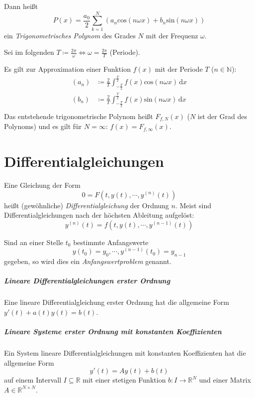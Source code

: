 			Dann heißt \[ P(x) = \frac{a _ 0}{2} \sum _ { k = 1 } ^ N (a _ n \text{cos}(n \omega x) + b _ n \text{sin}(n \omega x)) \] ein \textit{Trigonometrisches Polynom} des Grades $ N $ mit der Frequenz $ \omega $.

			Sei im folgenden $ T \coloneqq \frac{2\pi}{\omega} \iff \omega = \frac{2\pi}{T} $ (Periode).

			Es gilt zur Approximation einer Funktion $ f(x) $ mit der Periode $ T $ ($ n \in \mathbb{N} $):
			\begin{align*}
				(a _ n) & \coloneqq \frac{2}{T} \int _ { - \frac{T}{2} } ^ \frac{T}{2} \! f(x) \text{cos}(n \omega x) \, \mathrm{d}x \\
				(b _ n) & \coloneqq \frac{2}{T} \int _ { - \frac{T}{2} } ^ \frac{T}{2} \! f(x) \text{sin}(n \omega x) \, \mathrm{d}x \\
			\end{align*}
			Das entstehende trigonometrische Polynom heißt $ F _ { f, N } (x) $ ($ N $ ist der Grad des Polynoms) und es gilt für $ N = \infty $: $ f(x) = F _ { f, \infty } (x) $.

	\chapter{Differentialgleichungen}
		Eine Gleichung der Form \[ 0 = F(t, y(t), \cdots, y ^ {(n)}(t)) \] heißt (gewöhnliche) \textit{Differentialgleichung} der Ordnung $ n $. Meist sind Differentialgleichungen nach der höchsten Ableitung aufgelöst: \[ y ^ {(n)} (t) = f(t, y(t), \cdots, y ^ {(n - 1)} (t)) \]

		Sind an einer Stelle $ t _ 0 $ bestimmte Anfangswerte \[ y(t _ 0) = y _ 0, \cdots, y ^ {(n - 1)} (t _ 0) = y _ { n - 1 } \] gegeben, so wird dies ein \textit{Anfangswertproblem} genannt.

		\paragraph{Lineare Differentialgleichungen erster Ordnung}
			\label{p:dgllinear}

			Eine lineare Differentialgleichung erster Ordnung hat die allgemeine Form $ y'(t) + a(t)y(t) = b(t) $.

		\paragraph{Lineare Systeme erster Ordnung mit konstanten Koeffizienten}
			Ein System lineare Differentialgleichungen mit konstanten Koeffizienten hat die allgemeine Form
			\begin{equation*}
				y'(t) = Ay(t) + b(t)
			\end{equation*}
			auf einem Intervall $ I \subseteq \mathbb{R} $ mit einer stetigen Funktion $ b : I \rightarrow \mathbb{R} ^ N $ und einer Matrix $ A \in \mathbb{R} ^ { N \times N } $.

